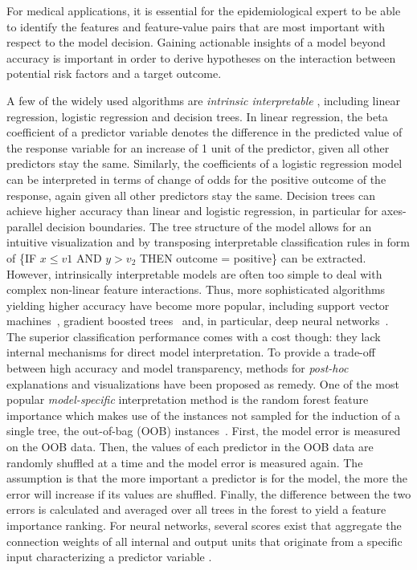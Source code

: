 \documentclass[
]{book}
\begin{document}
For medical applications, it is essential for the epidemiological expert to be able to identify the features and feature-value pairs that are most important with respect to the model decision.
Gaining actionable insights of a model beyond accuracy is important in order to derive hypotheses on the interaction between potential risk factors and a target outcome.

A few of the widely used algorithms are \emph{intrinsic interpretable} \autocite{Lipton:ICML2015}, including linear regression, logistic regression and decision trees.
In linear regression, the beta coefficient of a predictor variable denotes the difference in the predicted value of the response variable for an increase of 1 unit of the predictor, given all other predictors stay the same.
Similarly, the coefficients of a logistic regression model can be interpreted in terms of change of odds for the positive outcome of the response, again given all other predictors stay the same.
Decision trees can achieve higher accuracy than linear and logistic regression, in particular for axes-parallel decision boundaries.
The tree structure of the model allows for an intuitive visualization and by transposing interpretable classification rules in form of \{IF \(x \leq v1\) AND \(y>v_2\) THEN outcome = positive\} can be extracted.
However, intrinsically interpretable models are often too simple to deal with complex non-linear feature interactions.
Thus, more sophisticated algorithms yielding higher accuracy have become more popular, including support vector machines~\autocite{Boser:SVM1992}, gradient boosted trees~\autocite{Friedman:PDP2001} and, in particular, deep neural networks~\autocite{Goodfellow:DL2016}.
The superior classification performance comes with a cost though: they lack internal mechanisms for direct model interpretation.
To provide a trade-off between high accuracy and model transparency, methods for \emph{post-hoc} explanations and visualizations have been proposed as remedy.
One of the most popular \emph{model-specific} interpretation method is the random forest feature importance which makes use of the instances not sampled for the induction of a single tree, the out-of-bag (OOB) instances~\autocite{Breiman:RandomForests2001}. First, the model error is measured on the OOB data. Then, the values of each predictor in the OOB data are randomly shuffled at a time and the model error is measured again.
The assumption is that the more important a predictor is for the model, the more the error will increase if its values are shuffled.
Finally, the difference between the two errors is calculated and averaged over all trees in the forest to yield a feature importance ranking.
For neural networks, several scores exist that aggregate the connection weights of all internal and output units that originate from a specific input characterizing a predictor variable \autocite{Olden:NNInterpretation2004}.
\end{document}
